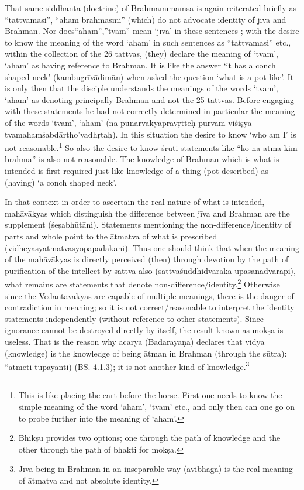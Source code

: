 That same siddhānta (doctrine) of Brahmamīmāmsā is again reiterated briefly as- “tattvamasi”, “aham brahmāsmi” (which) do not advocate identity of jīva and Brahman. Nor does“aham”,”tvam” mean ‘jīva’ in these sentences ; with the desire to know the meaning of the word ‘aham’ in such sentences as “tattvamasi” etc., within the collection of the 26 tattvas, (they) declare the meaning of ‘tvam’, ‘aham’ as having reference to Brahman. It is like the answer ‘it has a conch shaped neck’ (kambugrīvādimān) when asked the question ‘what is a pot like’. It is only then that the disciple understands the meanings of the words ‘tvam’, ‘aham’ as denoting principally Brahman and not the 25 tattvas. Before engaging with these statements he had not correctly determined in particular the meaning of the words ‘tvam’, ‘aham’ (na punarvākyapravṛtteḥ pūrvam viśiṣya tvamahamśabdārtho’vadhṛtaḥ).  In this situation the desire to know ‘who am I’ is not reasonable.\footnote{This is like placing the cart before the horse. First one needs to know the simple meaning of the word ‘aham’, ‘tvam’ etc., and only then can one go on to probe further into the meaning of ‘aham’.} So also the desire to know śruti statements like “ko na ātmā kim brahma” is also not reasonable. The knowledge of Brahman which is what is intended is first required just like knowledge of a thing (pot described) as (having) ‘a conch shaped neck’.

In that context in order to ascertain the real nature of what is intended, mahāvākyas which distinguish the difference between jīva and Brahman are the supplement (śeṣabhūtāni). Statements mentioning the non-difference/identity of parts and whole point to the ātmatva of what is prescribed (vidheyasyātmatvasyopapādakāni). Thus one should think that when the meaning of the mahāvākyas is directly perceived (then) through devotion by the path of purification of the intellect by sattva also (sattvaśuddhidvāraka upāsanādvārāpi),  what remains are statements that denote non-difference/identity.\footnote{Bhikṣu provides two options; one through the path of knowledge and the other through the path of bhakti for mokṣa.} Otherwise since the Vedāntavākyas are capable of multiple meanings, there is the danger of contradiction in meaning; so it is not correct/reasonable to interpret the identity statements independently (without reference to other statements). Since ignorance cannot be destroyed directly by itself, the result known as mokṣa is useless. That is the reason why ācārya (Badarāyaṇa) declares that vidyā (knowledge) is the knowledge of being ātman in Brahman (through the sūtra): “ātmeti tūpayanti) (BS. 4.1.3); it is not another kind of knowledge.\footnote{Jīva being in Brahman in an inseparable way (avibhāga) is the real meaning of ātmatva and not absolute identity.} 


